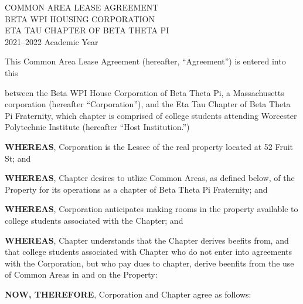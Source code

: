 \documentclass[12pt]{article}
\begin{document}
\begin{center}
        COMMON AREA LEASE AGREEMENT\\
        BETA WPI HOUSING CORPORATION\\
        ETA TAU CHAPTER OF BETA THETA PI\\
        2021--2022 Academic Year
\end{center}

This Common Area Lease Agreement (hereafter, “Agreement”) is entered into this \date{\today} between the Beta WPI House Corporation of Beta Theta Pi, a Massachusetts corporation (hereafter ``Corporation''), and the Eta Tau Chapter of Beta Theta Pi Fraternity, which chapter is comprised of college students attending Worcester Polytechnic Institute (hereafter ``Host Institution.'')

\textbf{WHEREAS}, Corporation is the Lessee of the real property located at 52 Fruit St; and

\textbf{WHEREAS}, Chapter desires to utlize Common Areas, as defined below, of the Property for its operations as a chapter of Beta Theta Pi Fraternity; and

\textbf{WHEREAS}, Corporation anticipates making rooms in the property available to college students associated with the Chapter; and

\textbf{WHEREAS}, Chapter understands that the Chapter derives beefits from, and that college students associated with Chapter who do not enter into agreements with the Corporation, but who pay dues to chapter, derive beenfits from the use of Common Areas in and on the Property:

\textbf{NOW, THEREFORE}, Corporation and Chapter agree as follows:
\end{document}
